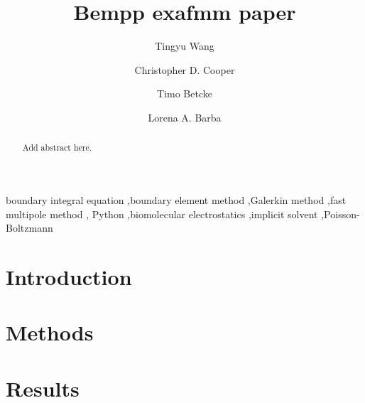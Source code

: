 \documentclass[final,5p,times,twocolumn]{elsarticle}
\begin{document}
\begin{frontmatter}
\title{Bempp exafmm paper}

\author[gwu]{Tingyu Wang}

\author[usm]{Christopher D. Cooper}

\author[ucl]{Timo Betcke}

\author[gwu]{Lorena A. Barba}

\address[gwu]{Department of Mechanical and Aerospace Engineering, The George Washington University, Washington DC}
\address[usm]{Department of Mechanical Engineering, Universidad T\'ecnica Federico Santa Mar\'ia, Valpara\'iso, Chile}
\address[ucl]{Department of Mathematics, University College London, UK}

\begin{abstract}
    Add abstract here.
\end{abstract}

\begin{keyword}
    boundary integral equation \sep boundary element method \sep Galerkin method \sep fast multipole method \sep
    Python \sep biomolecular electrostatics \sep implicit solvent \sep Poisson-Boltzmann
\end{keyword}

\end{frontmatter}

\section{Introduction}\label{sec:intro}


\section{Methods}\label{sec:methods}


\section{Results}\label{sec:results}

\end{document}
